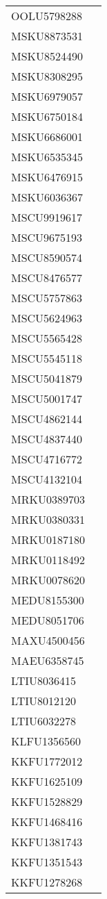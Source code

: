 \documentclass[a4paper]{report}
\begin{document}
\begin{longtable}{| p{4cm} | p{10cm} |}
	OOLU5798288  &  \\
	MSKU8873531  &  \\
	MSKU8524490  &  \\
	MSKU8308295  &  \\
	MSKU6979057  &  \\
	MSKU6750184  &  \\
	MSKU6686001  &  \\
	MSKU6535345  &  \\
	MSKU6476915  &  \\
	MSKU6036367  &  \\
	MSCU9919617  &  \\
	MSCU9675193  &  \\
	MSCU8590574  &  \\
	MSCU8476577  &  \\
	MSCU5757863  &  \\
	MSCU5624963  &  \\
	MSCU5565428  &  \\
	MSCU5545118  &  \\
	MSCU5041879  &  \\
	MSCU5001747  &  \\
	MSCU4862144  &  \\
	MSCU4837440  &  \\
	MSCU4716772  &  \\
	MSCU4132104  &  \\
	MRKU0389703  &  \\
	MRKU0380331  &  \\
	MRKU0187180  &  \\
	MRKU0118492  &  \\
	MRKU0078620  &  \\
	MEDU8155300  &  \\
	MEDU8051706  &  \\
	MAXU4500456  &  \\
	MAEU6358745  &  \\
	LTIU8036415  &  \\
	LTIU8012120  &  \\
	LTIU6032278  &  \\
	KLFU1356560  &  \\
	KKFU1772012  &  \\
	KKFU1625109  &  \\
	KKFU1528829  &  \\
	KKFU1468416  &  \\
	KKFU1381743  &  \\
	KKFU1351543  &  \\
	KKFU1278268  &  \\

\end{longtable}
\end{document}
